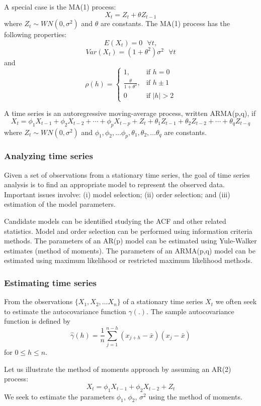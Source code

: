 A special case is the MA(1) process: 
$$
X_t = Z_t + \theta Z_{t-1}
$$
where $Z_t \sim WN(0,\sigma^2)$ and $\theta$ are constants.
The MA(1) process has the following properties:
$$
E(X_t) = 0  \,\,\,\, \forall t,
$$
$$
Var(X_t) = (1+\theta^2) \sigma^2  \,\,\,\, \forall t
$$
and
$$
\rho(h) =
\begin{cases}
    1,	            & \text{if } h = 0\\
    \frac{\theta}{1+\theta^2},              & \text{if } h \pm 1\\
    0              & \text{if } |h| > 2
\end{cases}
$$


\bigskip
A time series is an autoregressive moving-average process, written ARMA(p,q), if 
$$
X_t = \phi_1 X_{t-1} + \phi_2 X_{t-2} + \cdots + \phi_p X_{t-p} +Z_t + \theta_1 Z_{t-1} + \theta_2 Z_{t-2} + \cdots + \theta_q Z_{t-q} 
$$
where $Z_t \sim WN(0,\sigma^2)$ and $\phi_1, \phi_2, \ldots \phi_p, \theta_1, \theta_2, \ldots \theta_q$ are constants.


\subsubsection{Analyzing time series}
Given a set of observations from a stationary time series, the goal of time series analysis is to find an appropriate model to represent the observed data.
Important issues involve: (i) model selection;  (ii) order selection; and (iii) estimation of the model parameters.


Candidate models can be identified studying the ACF and other related statistics.
Model and order selection can be performed using information criteria methods. 
The parameters of an AR(p) model can be estimated using Yule-Walker estimates (method of moments).
The parameters of an ARMA(p,q) model can be estimated using maximum likelihood or restricted maximum likelihood methods.

\subsubsection{Estimating time series}

From the observations $\{ X_1, X_2,\ldots X_n \}$ of a stationary time series $X_t$ we often seek to estimate the autocovariance function $\gamma(.)$.
The sample autocovariance function is defined by
$$
\hat \gamma(h) = \frac{1}{n} \sum_{j=1}^{n-h} (x_{j+h} - \bar x)(x_{j} - \bar x)
$$
for $0 \le h \le n$.

Let us illustrate the method of moments approach by assuming an AR(2) process:
$$
X_t = \phi_1 X_{t-1} + \phi_2 X_{t-2} + Z_t
$$
We seek to estimate the parameters $\phi_1$, $\phi_2$, $\sigma^2$ using the method of moments.

